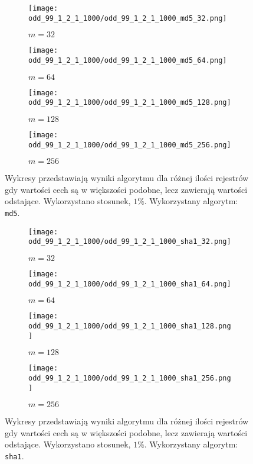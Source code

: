 \begin{figure}[H]
    \begin{subfigure}{0.5\textwidth}
        \texttt{[image: odd\_99\_1\_2\_1\_1000/odd\_99\_1\_2\_1\_1000\_md5\_32.png]}
        \caption{$m = 32$}
        \label{fig:subim1}
    \end{subfigure}
    \begin{subfigure}{0.5\textwidth}
        \texttt{[image: odd\_99\_1\_2\_1\_1000/odd\_99\_1\_2\_1\_1000\_md5\_64.png]}
        \caption{$m = 64$}
        \label{fig:subim1}
    \end{subfigure}
    \begin{subfigure}{0.5\textwidth}
        \texttt{[image: odd\_99\_1\_2\_1\_1000/odd\_99\_1\_2\_1\_1000\_md5\_128.png]}
        \caption{$m = 128$}
        \label{fig:subim2}
    \end{subfigure}
    \begin{subfigure}{0.5\textwidth}
        \texttt{[image: odd\_99\_1\_2\_1\_1000/odd\_99\_1\_2\_1\_1000\_md5\_256.png]}
        \caption{$m = 256$}
        \label{fig:subim2}
    \end{subfigure}

    \caption{Wykresy przedstawiają wyniki algorytmu dla różnej ilości rejestrów gdy wartości cech są w większości podobne, lecz zawierają wartości odstające. Wykorzystano stosunek, $1\%$. Wykorzystany algorytm: \texttt{md5}.}
    \label{fig:uniform_md5}
\end{figure}

\begin{figure}[H]
    \begin{subfigure}{0.5\textwidth}
        \texttt{[image: odd\_99\_1\_2\_1\_1000/odd\_99\_1\_2\_1\_1000\_sha1\_32.png]}
        \caption{$m = 32$}
        \label{fig:subim1}
    \end{subfigure}
    \begin{subfigure}{0.5\textwidth}
        \texttt{[image: odd\_99\_1\_2\_1\_1000/odd\_99\_1\_2\_1\_1000\_sha1\_64.png]}
        \caption{$m = 64$}
        \label{fig:subim1}
    \end{subfigure}
    \begin{subfigure}{0.5\textwidth}
        \texttt{[image: odd\_99\_1\_2\_1\_1000/odd\_99\_1\_2\_1\_1000\_sha1\_128.png]}
        \caption{$m = 128$}
        \label{fig:subim2}
    \end{subfigure}
    \begin{subfigure}{0.5\textwidth}
        \texttt{[image: odd\_99\_1\_2\_1\_1000/odd\_99\_1\_2\_1\_1000\_sha1\_256.png]}
        \caption{$m = 256$}
        \label{fig:subim2}
    \end{subfigure}

    \caption{Wykresy przedstawiają wyniki algorytmu dla różnej ilości rejestrów gdy wartości cech są w większości podobne, lecz zawierają wartości odstające. Wykorzystano stosunek, $1\%$. Wykorzystany algorytm: \texttt{sha1}.}
    \label{fig:uniform_sha1}
\end{figure}


